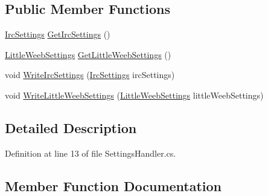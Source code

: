 \subsection*{Public Member Functions}
\begin{DoxyCompactItemize}
\item 
\mbox{\hyperlink{class_little_weeb_library_1_1_settings_1_1_irc_settings}{Irc\+Settings}} \mbox{\hyperlink{interface_little_weeb_library_1_1_handlers_1_1_i_settings_handler_a8ee9be789e628c80fae0db96d890569b}{Get\+Irc\+Settings}} ()
\item 
\mbox{\hyperlink{class_little_weeb_library_1_1_settings_1_1_little_weeb_settings}{Little\+Weeb\+Settings}} \mbox{\hyperlink{interface_little_weeb_library_1_1_handlers_1_1_i_settings_handler_a493bc8df18211fa8c3874371b809e006}{Get\+Little\+Weeb\+Settings}} ()
\item 
void \mbox{\hyperlink{interface_little_weeb_library_1_1_handlers_1_1_i_settings_handler_a0c2480bc0a0ff28ed1dc68d32817efc6}{Write\+Irc\+Settings}} (\mbox{\hyperlink{class_little_weeb_library_1_1_settings_1_1_irc_settings}{Irc\+Settings}} irc\+Settings)
\item 
void \mbox{\hyperlink{interface_little_weeb_library_1_1_handlers_1_1_i_settings_handler_a6b2cfe838785ae84db9608fb041c5fb5}{Write\+Little\+Weeb\+Settings}} (\mbox{\hyperlink{class_little_weeb_library_1_1_settings_1_1_little_weeb_settings}{Little\+Weeb\+Settings}} little\+Weeb\+Settings)
\end{DoxyCompactItemize}


\subsection{Detailed Description}


Definition at line 13 of file Settings\+Handler.\+cs.



\subsection{Member Function Documentation}
\mbox{\label{interface_little_weeb_library_1_1_handlers_1_1_i_settings_handler_a8ee9be789e628c80fae0db96d890569b}} 
